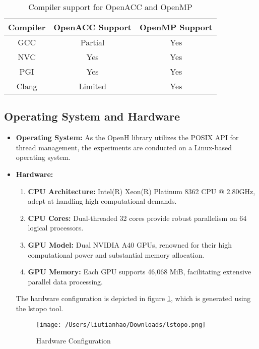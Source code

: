 \documentclass[13pt]{article}
\begin{document}
\begin{table}[h!]
    \centering
    \begin{tabular}{|c|c|c|}
    \hline
    \textbf{Compiler} & \textbf{OpenACC Support} & \textbf{OpenMP Support} \\
    \hline
    GCC & Partial & Yes \\ \hline
    NVC & Yes & Yes \\ \hline
    PGI & Yes & Yes \\ \hline
    Clang & Limited & Yes \\ \hline
    \end{tabular}
    \caption{Compiler support for OpenACC and OpenMP}
    \label{tab:compiler_support}
\end{table}

\subsection{Operating System and Hardware}

\begin{itemize}
    \item \textbf{Operating System:}
    As the OpenH library utilizes the POSIX API for thread management, the experiments are conducted on a Linux-based operating system.

    \item \textbf{Hardware:}
    \begin{enumerate}
        \item \textbf{CPU Architecture:} Intel(R) Xeon(R) Platinum 8362 CPU @ 2.80GHz, adept at handling high computational demands.
        
        \item \textbf{CPU Cores:} Dual-threaded 32 cores provide robust parallelism on 64 logical processors.
        
        \item \textbf{GPU Model:} Dual NVIDIA A40 GPUs, renowned for their high computational power and substantial memory allocation.
        
        \item \textbf{GPU Memory:} Each GPU supports 46,068 MiB, facilitating extensive parallel data processing. 
    \end{enumerate}
    The hardware configuration is depicted in figure \ref{fig:hardware}, which is generated using the lstopo tool.

    \begin{figure}[h!]
        \centering
        \texttt{[image: /Users/liutianhao/Downloads/lstopo.png]}
        \caption{Hardware Configuration}
        \label{fig:hardware}
    \end{figure}

\end{itemize}
\end{document}

